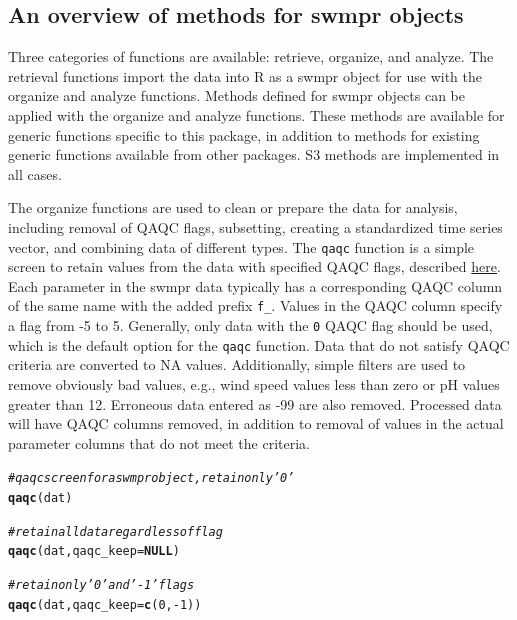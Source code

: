 \documentclass[10pt,letterpaper]{article}\usepackage[]{graphicx}\usepackage[]{color}
\makeatletter
\newcommand{\hlnum}[1]{\textcolor[rgb]{0.686,0.059,0.569}{#1}}%
\newcommand{\hlcom}[1]{\textcolor[rgb]{0.678,0.584,0.686}{\textit{#1}}}%
\newcommand{\hlopt}[1]{\textcolor[rgb]{0,0,0}{#1}}%
\newcommand{\hlstd}[1]{\textcolor[rgb]{0.345,0.345,0.345}{#1}}%
\newcommand{\hlkwa}[1]{\textcolor[rgb]{0.161,0.373,0.58}{\textbf{#1}}}%
\newcommand{\hlkwc}[1]{\textcolor[rgb]{0.333,0.667,0.333}{#1}}%
\newcommand{\hlkwd}[1]{\textcolor[rgb]{0.737,0.353,0.396}{\textbf{#1}}}%
\newenvironment{kframe}{%
 \def\at@end@of@kframe{}%
 \ifinner\ifhmode%
  \def\at@end@of@kframe{\end{minipage}}%
  \begin{minipage}{\columnwidth}%
 \fi\fi%
 \def\FrameCommand##1{\hskip\@totalleftmargin \hskip-\fboxsep
 \colorbox{shadecolor}{##1}\hskip-\fboxsep
     \hskip-\linewidth \hskip-\@totalleftmargin \hskip\columnwidth}%
 \MakeFramed {\advance\hsize-\width
   \@totalleftmargin\z@ \linewidth\hsize
   \@setminipage}}%
 {\par\unskip\endMakeFramed%
 \at@end@of@kframe}
\newenvironment{knitrout}{}{} %
\makeatother
\begin{document}
\subsection*{An overview of methods for swmpr objects}

Three categories of functions are available: retrieve, organize, and analyze.  The retrieval functions import the data into R as a swmpr object for use with the organize and analyze functions.  Methods defined for swmpr objects can be applied with the organize and analyze functions.  These methods are available for generic functions specific to this package, in addition to methods for existing generic functions available from other packages.  S3 methods are implemented in all cases.  

The organize functions are used to clean or prepare the data for analysis, including removal of QAQC flags, subsetting, creating a standardized time series vector, and combining data of different types.  The \texttt{qaqc} function is a simple screen to retain values from the data with specified QAQC flags, described \href{http://cdmo.baruch.sc.edu/data/qaqc.cfm}{here}.  Each parameter in the swmpr data typically has a corresponding QAQC column of the same name with the added prefix \texttt{f\_}.  Values in the QAQC column specify a flag from -5 to 5.  Generally, only data with the  \texttt{0} QAQC flag should be used, which is the default option for the \texttt{qaqc} function.  Data that do not satisfy QAQC criteria are converted to NA values.   Additionally, simple filters are used to remove obviously bad values, e.g., wind speed values less than zero or pH values greater than 12. Erroneous data entered as -99 are also removed. Processed data will have QAQC columns removed, in addition to removal of values in the actual parameter columns that do not meet the criteria. 

\begin{knitrout}
\color{fgcolor}\begin{kframe}
\begin{alltt}
\hlcom{# qaqc screen for a swmpr object, retain only '0'}
\hlkwd{qaqc}\hlstd{(dat)}

\hlcom{# retain all data regardless of flag}
\hlkwd{qaqc}\hlstd{(dat,} \hlkwc{qaqc_keep} \hlstd{=} \hlkwa{NULL}\hlstd{)}

\hlcom{# retain only '0' and '-1' flags}
\hlkwd{qaqc}\hlstd{(dat,} \hlkwc{qaqc_keep} \hlstd{=} \hlkwd{c}\hlstd{(}\hlnum{0}\hlstd{,} \hlopt{-}\hlnum{1}\hlstd{))}
\end{alltt}
\end{kframe}
\end{knitrout}
\end{document}
